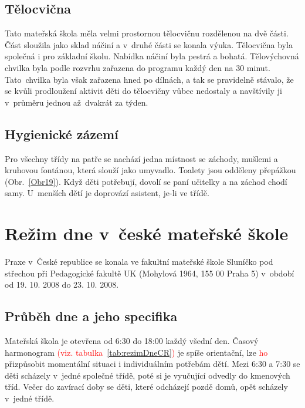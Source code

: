 		\subsection{Tělocvična}
			Tato mateřská škola měla velmi prostornou tělocvičnu rozdělenou na dvě části. Část sloužila jako sklad náčiní a v~druhé části se konala výuka. Tělocvična byla společná i pro základní školu. Nabídka náčiní byla pestrá a bohatá. Tělovýchovná chvilka byla podle rozvrhu zařazena do programu každý den na 30 minut. Tato chvilka byla však zařazena hned po dílnách, a tak se pravidelně stávalo, že se kvůli prodloužení aktivit děti do tělocvičny vůbec nedostaly a navštívily ji v~průměru jednou až dvakrát za týden. 

		\subsection{Hygienické zázemí}
		\label{zachody}
			Pro všechny třídy na patře se nachází jedna místnost se záchody, mušlemi a kruhovou fontánou, která slouží jako umyvadlo. Toalety jsou odděleny přepážkou (Obr.~\ref{Obr19}). Když děti potřebují, dovolí se paní učitelky a na záchod chodí samy. U~menších dětí je doprovází asistent, je-li ve třídě. 
	



\section{Režim dne v~české mateřské škole}

		Praxe v~České republice se konala ve fakultní mateřské škole Sluníčko pod střechou při Pedagogické fakultě UK (Mohylová 1964, 155 00 Praha 5) v~období od 19. 10. 2008 do 23. 10. 2008. 

	\subsection{Průběh dne a jeho specifika}

			Mateřská škola je otevřena od 6:30 do 18:00 každý všední den. Časový harmonogram
			\textcolor{red}{(viz. tabulka~\ref{tab:rezimDneCR})}
			je spíše orientační, lze \textcolor{red}{ho} přizpůsobit momentální situaci i individuálním potřebám dětí. Mezi 6:30 a 7:30 se děti scházely v~jedné společné třídě, poté si je vyučující odvedly do kmenových tříd. Večer do zavírací doby se děti, které odcházejí pozdě domů, opět scházely v~jedné třídě.

